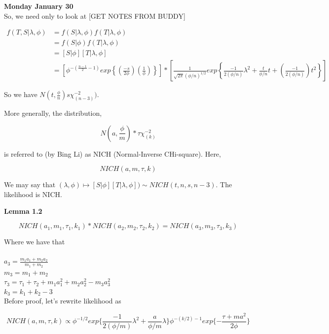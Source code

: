 \documentclass[11pt,fleqn]{book} %
\begin{document}
\textbf{Monday January 30}\\


So, we need only to look at [GET NOTES FROM BUDDY]


	\begin{align*}
		f(T, S |\lambda, \phi) &= f(S|\lambda, \phi) f(T|\lambda,\phi)\\
			&=f(S|\phi) f(T|\lambda, \phi)\\
			&=[S|\phi] [T|\lambda, \phi]\\
			&= \left[\phi^{-(\frac{n-1}{2} - 1)} exp\left\{(\frac{-s}{2\phi})(\frac{1}{\phi})\right\}\right] * \left[\frac{1}{\sqrt{2\pi} (\phi/n)^{1/2}} exp\left\{\frac{-1}{2(\phi/n)}\lambda^2 + \frac{t}{\phi/n}t + (\frac{-1}{2(\phi/n)})t^2\right \} \right]
	\end{align*}

	So we have $N(t, \frac{\phi}{n}) s\chi^{-2}_{(n-3)})$. 

	More generally, the distribution, 

			$$N(a, \frac{\phi}{m}) * \tau \chi^{-2}_{(k)} $$

	is referred to (by Bing Li) as NICH (Normal-Inverse CHi-square). Here, 

			$$NICH(a, m, \tau, k)$$


	We may say that $(\lambda, \phi) \mapsto [S|\phi][T|\lambda, \phi]) \sim NICH(t,n,s, n-3)$. The likelihood is NICH. 


\textbf{Lemma 1.2} 

		$$NICH(a_1, m_1, \tau_1, k_1) * NICH(a_2, m_2, \tau_2, k_2) = NICH(a_3, m_3, \tau_3, k_3)$$


		Where we have that\\
\\
		$a_3 = \frac{m_1a_1 + m_2a_2}{m_1 + m_2}$\\
		$m_3 = m_1 + m_2$\\
		$\tau_3 = \tau_1 + \tau_2 + m_1a_1^2 + m_2a_2^2 - m_3a_3^2$\\
		$k_3 = k_1 + k_2 -3$\\


Before proof, let's rewrite likelihood as

		$$NICH(a, m, \tau, k) \propto  \phi^{-1/2}exp\{\frac{-1}{2(\phi/m)}\lambda^2 + \frac{a}{\phi/m}\lambda\} \phi^{-(k/2) - 1} exp\{-\frac{\tau + ma^2}{2\phi}\}$$
\end{document}
